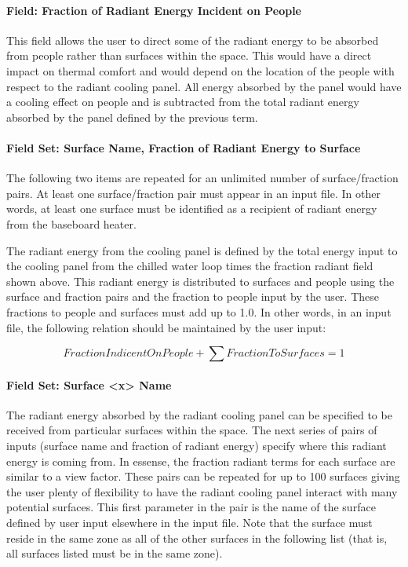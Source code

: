 \paragraph{Field: Fraction of Radiant Energy Incident on People}\label{field-fraction-of-radiant-energy-incident-on-people-2-1}

This field allows the user to direct some of the radiant energy to be absorbed from people rather than surfaces within the space.  This would have a direct impact on thermal comfort and would depend on the location of the people with respect to the radiant cooling panel.  All energy absorbed by the panel would have a cooling effect on people and is subtracted from the total radiant energy absorbed by the panel defined by the previous term.

\paragraph{Field Set: Surface Name, Fraction of Radiant Energy to Surface}\label{field-set-surface-name-fraction-of-radiant-energy-to-surface-2-1}

The following two items are repeated for an unlimited number of surface/fraction pairs. At least one surface/fraction pair must appear in an input file. In other words, at least one surface must be identified as a recipient of radiant energy from the baseboard heater.

The radiant energy from the cooling panel is defined by the total energy input to the cooling panel from the chilled water loop times the fraction radiant field shown above. This radiant energy is distributed to surfaces and people using the surface and fraction pairs and the fraction to people input by the user. These fractions to people and surfaces must add up to 1.0. In other words, in an input file, the following relation should be maintained by the user input:

\begin{equation}
FractionIndicentOnPeople + \sum {FractionToSurfaces = 1}
\end{equation}

\paragraph{Field Set: Surface \textless{}x\textgreater{} Name}\label{field-set-surface-x-name-1}

The radiant energy absorbed by the radiant cooling panel can be specified to be received from particular surfaces within the space.  The next series of pairs of inputs (surface name and fraction of radiant energy) specify where this radiant energy is coming from.  In essense, the fraction radiant terms for each surface are similar to a view factor.  These pairs can be repeated for up to 100 surfaces giving the user plenty of flexibility to have the radiant cooling panel interact with many potential surfaces.  This first parameter in the pair is the name of the surface defined by user input elsewhere in the input file.  Note that the surface must reside in the same zone as all of the other surfaces in the following list (that is, all surfaces listed must be in the same zone).

